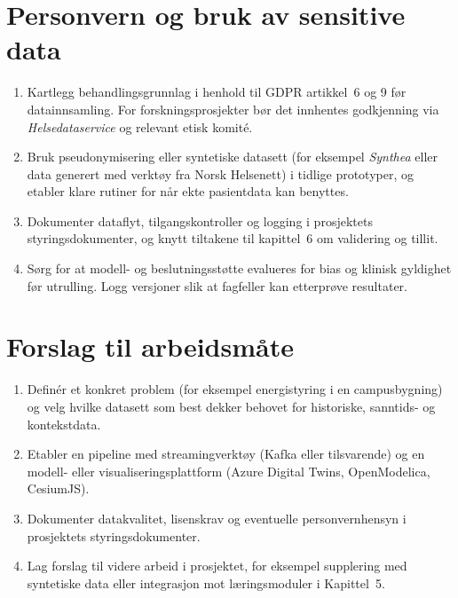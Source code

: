 \section{Personvern og bruk av sensitive data}
\begin{enumerate}
    \item Kartlegg behandlingsgrunnlag i henhold til GDPR artikkel~6 og 9 før datainnsamling. For forskningsprosjekter bør det innhentes godkjenning via \emph{Helsedataservice} og relevant etisk komité.
    \item Bruk pseudonymisering eller syntetiske datasett (for eksempel \emph{Synthea} eller data generert med verktøy fra Norsk Helsenett) i tidlige prototyper, og etabler klare rutiner for når ekte pasientdata kan benyttes.
    \item Dokumenter dataflyt, tilgangskontroller og logging i prosjektets styringsdokumenter, og knytt tiltakene til kapittel~6 om validering og tillit.
    \item Sørg for at modell- og beslutningsstøtte evalueres for bias og klinisk gyldighet før utrulling. Logg versjoner slik at fagfeller kan etterprøve resultater.
\end{enumerate}

\section{Forslag til arbeidsmåte}
\begin{enumerate}
    \item Definér et konkret problem (for eksempel energistyring i en campusbygning) og velg hvilke datasett som best dekker behovet for historiske, sanntids- og kontekstdata.
    \item Etabler en pipeline med streamingverktøy (Kafka eller tilsvarende) og en modell- eller visualiseringsplattform (Azure Digital Twins, OpenModelica, CesiumJS).
    \item Dokumenter datakvalitet, lisenskrav og eventuelle personvernhensyn i prosjektets styringsdokumenter.
    \item Lag forslag til videre arbeid i prosjektet, for eksempel supplering med syntetiske data eller integrasjon mot læringsmoduler i Kapittel~5.
\end{enumerate}

